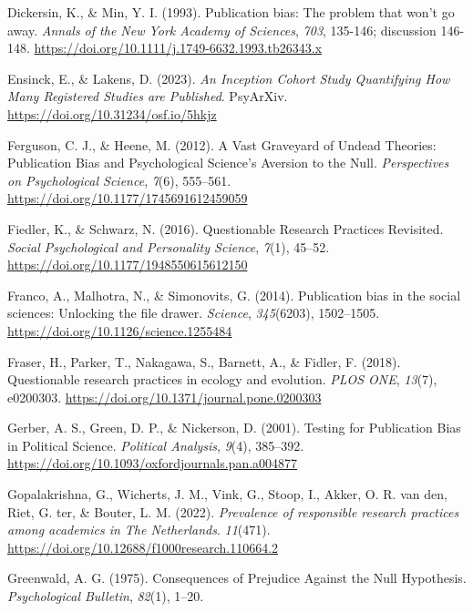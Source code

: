 \documentclass[
  british,
  a4paper,
  ,man,mask,floatsintext]{apa6}
\newlength{\cslhangindent}
\newenvironment{CSLReferences}[2] %
 {\begin{list}{}{%
  \setlength{\itemindent}{0pt}
  \setlength{\leftmargin}{0pt}
  \setlength{\parsep}{0pt}
  \ifodd #1
   \setlength{\leftmargin}{\cslhangindent}
   \setlength{\itemindent}{-1\cslhangindent}
  \fi
  \setlength{\itemsep}{#2\baselineskip}}}
 {\end{list}}
\begin{document}
\begin{CSLReferences}{1}{0}
Dickersin, K., \& Min, Y. I. (1993). Publication bias: The problem that won't go away. \emph{Annals of the New York Academy of Sciences}, \emph{703}, 135-146; discussion 146-148. \url{https://doi.org/10.1111/j.1749-6632.1993.tb26343.x}

Ensinck, E., \& Lakens, D. (2023). \emph{An {Inception Cohort Study Quantifying How Many Registered Studies} are {Published}}. PsyArXiv. \url{https://doi.org/10.31234/osf.io/5hkjz}

Ferguson, C. J., \& Heene, M. (2012). A {Vast Graveyard} of {Undead Theories}: {Publication Bias} and {Psychological Science}'s {Aversion} to the {Null}. \emph{Perspectives on Psychological Science}, \emph{7}(6), 555--561. \url{https://doi.org/10.1177/1745691612459059}

Fiedler, K., \& Schwarz, N. (2016). Questionable {Research Practices Revisited}. \emph{Social Psychological and Personality Science}, \emph{7}(1), 45--52. \url{https://doi.org/10.1177/1948550615612150}

Franco, A., Malhotra, N., \& Simonovits, G. (2014). Publication bias in the social sciences: {Unlocking} the file drawer. \emph{Science}, \emph{345}(6203), 1502--1505. \url{https://doi.org/10.1126/science.1255484}

Fraser, H., Parker, T., Nakagawa, S., Barnett, A., \& Fidler, F. (2018). Questionable research practices in ecology and evolution. \emph{PLOS ONE}, \emph{13}(7), e0200303. \url{https://doi.org/10.1371/journal.pone.0200303}

Gerber, A. S., Green, D. P., \& Nickerson, D. (2001). Testing for {Publication Bias} in {Political Science}. \emph{Political Analysis}, \emph{9}(4), 385--392. \url{https://doi.org/10.1093/oxfordjournals.pan.a004877}

Gopalakrishna, G., Wicherts, J. M., Vink, G., Stoop, I., Akker, O. R. van den, Riet, G. ter, \& Bouter, L. M. (2022). \emph{Prevalence of responsible research practices among academics in {The Netherlands}}. \emph{11}(471). \url{https://doi.org/10.12688/f1000research.110664.2}

Greenwald, A. G. (1975). Consequences of {Prejudice Against} the {Null Hypothesis}. \emph{Psychological Bulletin}, \emph{82}(1), 1--20.


\end{CSLReferences}
\end{document}
